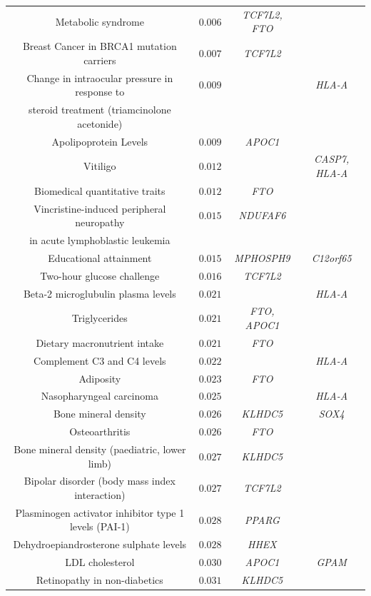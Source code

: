 \documentclass[10pt]{article}
\begin{document}
\begin{table}[!htbp]
{\begin{tabular}{@{\extracolsep{5pt}} cccc}
Metabolic syndrome & $0.006$ & \textit{TCF7L2, FTO} &  \\ 
Breast Cancer in BRCA1 mutation carriers & $0.007$ & \textit{TCF7L2} &  \\ 
Change in intraocular pressure in response to  & $0.009$ &  & \textit{HLA-A} \\ 
steroid treatment (triamcinolone acetonide) &  &  &  \\ 
Apolipoprotein Levels & $0.009$ & \textit{APOC1} &  \\ 
Vitiligo & $0.012$ &  & \textit{CASP7, HLA-A} \\ 
Biomedical quantitative traits & $0.012$ & \textit{FTO} &  \\ 
Vincristine-induced peripheral neuropathy  & $0.015$ & \textit{NDUFAF6} &  \\ 
in acute lymphoblastic leukemia &  &  &  \\
Educational attainment & $0.015$ & \textit{MPHOSPH9} & \textit{C12orf65} \\ 
Two-hour glucose challenge & $0.016$ & \textit{TCF7L2} &  \\ 
Beta-2 microglubulin plasma levels & $0.021$ &  & \textit{HLA-A} \\ 
Triglycerides & $0.021$ & \textit{FTO, APOC1} &  \\ 
Dietary macronutrient intake & $0.021$ & \textit{FTO} &  \\ 
Complement C3 and C4 levels & $0.022$ &  & \textit{HLA-A}  \\ 
Adiposity & $0.023$ & \textit{FTO} &  \\ 
Nasopharyngeal carcinoma & $0.025$ &  & \textit{HLA-A} \\ 
Bone mineral density & $0.026$ & \textit{KLHDC5} & \textit{SOX4} \\ 
Osteoarthritis & $0.026$ & \textit{FTO} &  \\ 
Bone mineral density (paediatric, lower limb) & $0.027$ & \textit{KLHDC5} &  \\ 
Bipolar disorder (body mass index interaction) & $0.027$ & \textit{TCF7L2} &  \\ 
Plasminogen activator inhibitor type 1 levels (PAI-1) & $0.028$ & \textit{PPARG} &  \\ 
Dehydroepiandrosterone sulphate levels & $0.028$ & \textit{HHEX} &  \\ 
LDL cholesterol & $0.030$ & \textit{APOC1}  & \textit{GPAM} \\ 
Retinopathy in non-diabetics & $0.031$ & \textit{KLHDC5} &  \\ 

\end{tabular}}
\end{table}
\end{document}
